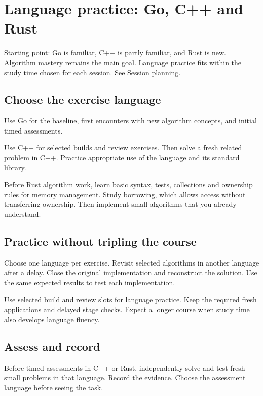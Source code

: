 \documentclass[11pt,letterpaper]{article}
\begin{document}
\section{Language practice: Go, C++ and Rust}\label{sec:24}

Starting point: Go is familiar, C++ is partly familiar, and Rust is new. Algorithm mastery remains the main goal. Language practice fits within the study time chosen for each session. See \hyperref[sec:25]{Session planning}.

\subsection*{Choose the exercise language}

Use Go for the baseline, first encounters with new algorithm concepts, and initial timed assessments.

Use C++ for selected builds and review exercises. Then solve a fresh related problem in C++. Practice appropriate use of the language and its standard library.

Before Rust algorithm work, learn basic syntax, tests, collections and ownership rules for memory management. Study borrowing, which allows access without transferring ownership. Then implement small algorithms that you already understand.

\subsection*{Practice without tripling the course}

Choose one language per exercise. Revisit selected algorithms in another language after a delay. Close the original implementation and reconstruct the solution. Use the same expected results to test each implementation.

Use selected build and review slots for language practice. Keep the required fresh applications and delayed stage checks. Expect a longer course when study time also develops language fluency.

\subsection*{Assess and record}

Before timed assessments in C++ or Rust, independently solve and test fresh small problems in that language. Record the evidence. Choose the assessment language before seeing the task.
\end{document}

